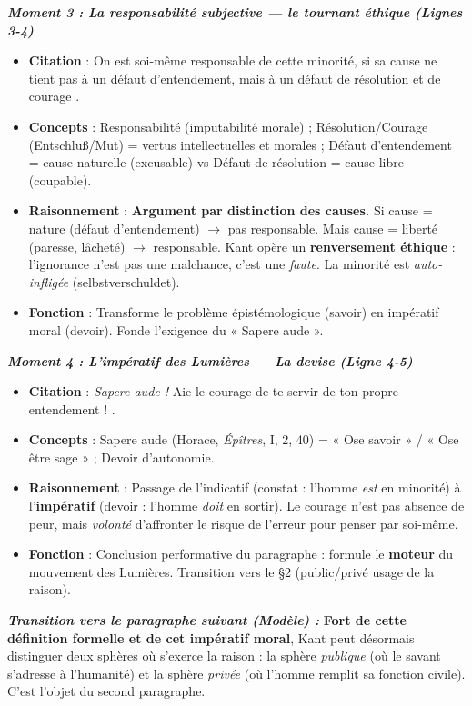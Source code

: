 \documentclass[11pt]{article}
\newcommand{\cle}[1]{{\popxbold\color{popdark}#1}}
\begin{document}
\begin{experience}
\emph{\textbf{Moment 3 : La responsabilité subjective — le tournant éthique (Lignes 3-4)}}
\begin{itemize}
    \item \textbf{Citation} : \guillemotleft On est soi-même responsable de cette minorité, si sa cause ne tient pas à un défaut d'entendement, mais à un défaut de résolution et de courage \guillemotright.
    \item \textbf{Concepts} : \cle{Responsabilité} (imputabilité morale) ; \cle{Résolution/Courage} (Entschluß/Mut) = vertus intellectuelles et morales ; \cle{Défaut d'entendement} = cause naturelle (excusable) vs \cle{Défaut de résolution} = cause libre (coupable).
    \item \textbf{Raisonnement} : \textbf{Argument par distinction des causes.} Si cause = nature (défaut d'entendement) $\rightarrow$ pas responsable. Mais cause = liberté (paresse, lâcheté) $\rightarrow$ responsable. Kant opère un \textbf{renversement éthique} : l'ignorance n'est pas une malchance, c'est une \emph{faute}. La minorité est \emph{auto-infligée} (selbstverschuldet).
    \item \textbf{Fonction} : Transforme le problème épistémologique (savoir) en impératif moral (devoir). Fonde l'exigence du « Sapere aude ».
\end{itemize}

\emph{\textbf{Moment 4 : L'impératif des Lumières — La devise (Ligne 4-5)}}
\begin{itemize}
    \item \textbf{Citation} : \guillemotleft \emph{Sapere aude !} Aie le courage de te servir de ton propre entendement ! \guillemotright.
    \item \textbf{Concepts} : \cle{Sapere aude} (Horace, \emph{Épîtres}, I, 2, 40) = « Ose savoir » / « Ose être sage » ; \cle{Devoir d'autonomie}.
    \item \textbf{Raisonnement} : Passage de l'indicatif (constat : l'homme \emph{est} en minorité) à l'\textbf{impératif} (devoir : l'homme \emph{doit} en sortir). Le courage n'est pas absence de peur, mais \emph{volonté} d'affronter le risque de l'erreur pour penser par soi-même.
    \item \textbf{Fonction} : Conclusion performative du paragraphe : formule le \textbf{moteur} du mouvement des Lumières. Transition vers le §2 (public/privé usage de la raison).
\end{itemize}

\emph{\textbf{Transition vers le paragraphe suivant (Modèle) :}} \guillemotleft \textbf{Fort de cette définition formelle et de cet impératif moral}, Kant peut désormais distinguer deux sphères où s'exerce la raison : la sphère \emph{publique} (où le savant s'adresse à l'humanité) et la sphère \emph{privée} (où l'homme remplit sa fonction civile). C'est l'objet du second paragraphe. \guillemotright
\end{experience}
\end{document}
